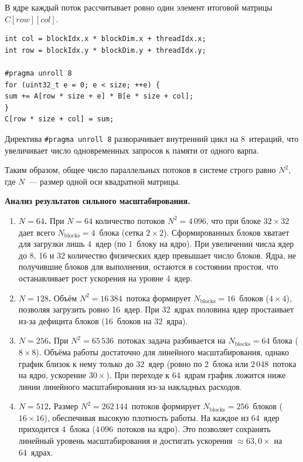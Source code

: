 \documentclass[a4paper]{article}
\begin{document}
В ядре каждый поток рассчитывает ровно один элемент итоговой матрицы $C[row][col]$.

\begin{verbatim}
int col = blockIdx.x * blockDim.x + threadIdx.x;
int row = blockIdx.y * blockDim.y + threadIdx.y;

#pragma unroll 8
for (uint32_t e = 0; e < size; ++e) {
sum += A[row * size + e] * B[e * size + col];
}
C[row * size + col] = sum;
\end{verbatim}

Директива \texttt{\#pragma unroll 8} разворачивает внутренний цикл на 8~итераций, что увеличивает число одновременных запросов к памяти от одного варпа.

Таким образом, общее число параллельных потоков в системе строго равно $N^2$, где $N$~--- размер одной оси квадратной матрицы.

\textbf{Анализ результатов сильного масштабирования.}
\begin{enumerate}
    \item \textbf{$N = 64$.} 
    При $N = 64$ количество потоков $N^2 = 4\,096$, что при блоке $32 \times 32$ дает всего $N_{\text{blocks}} = 4$~блока (сетка $2 \times 2$). Сформированных блоков хватает для загрузки лишь 4~ядер (по 1~блоку на ядро). При увеличении числа ядер до 8, 16 и 32 количество физических ядер превышает число блоков. Ядра, не получившие блоков для выполнения, остаются в состоянии простоя, что останавливает рост ускорения на уровне 4~ядер. 

    \item \textbf{$N = 128$.} 
    Объём $N^2 = 16\,384$~потока формирует $N_{\text{blocks}} = 16$~блоков ($4 \times 4$), позволяя загрузить ровно 16~ядер. При 32~ядрах половина ядер простаивает из-за дефицита блоков (16~блоков на 32~ядра).

    \item \textbf{$N = 256$.} 
    При $N^2 = 65\,536$~потоках задача разбивается на $N_{\text{blocks}} = 64$ блока ($8 \times 8$). Объёма работы достаточно для линейного масштабирования, однако график близок к нему только до 32~ядер (ровно по 2~блока или $2\,048$~потока на ядро, ускорение $30\times$). При переходе к 64~ядрам график ложится ниже линии линейного масштабирования из-за накладных расходов.
    
    \item \textbf{$N = 512$.} 
    Размер $N^2 = 262\,144$~потоков формирует $N_{\text{blocks}} = 256$~блоков ($16 \times 16$), обеспечивая высокую плотность работы. На каждое из 64~ядер приходится $4$~блока ($4\,096$~потоков на ядро). Это позволяет сохранять линейный уровень масштабирования и достигать ускорения $\approx 63{,}0\times$ на 64~ядрах.
\end{enumerate}
\end{document}
